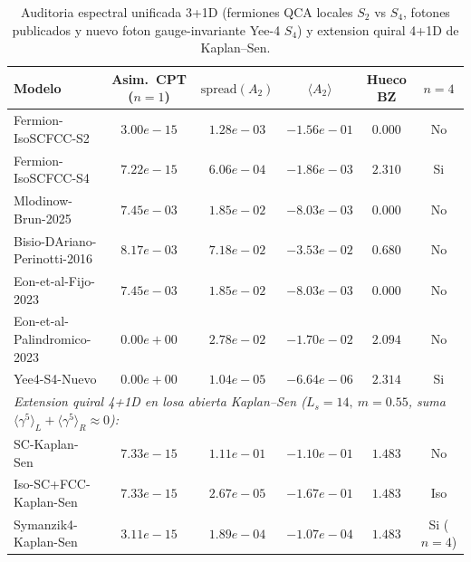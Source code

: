 
\begin{table}[t]
\centering
\caption{Auditoria espectral unificada 3+1D (fermiones QCA locales $S_2$ vs $S_4$, fotones publicados y nuevo foton gauge-invariante Yee-4 $S_4$) y extension quiral 4+1D de Kaplan--Sen.}
\label{tab:via_a_audit}
\begin{tabular}{lccccc}
\toprule
Modelo & Asim.\ CPT ($n=1$) & $\mathrm{spread}(A_2)$ & $\langle A_2\rangle$ & Hueco BZ & $n=4$ \\
\midrule
Fermion-IsoSCFCC-S2 & $3.00e-15$ & $1.28e-03$ & $-1.56e-01$ & $0.000$ & No \\
Fermion-IsoSCFCC-S4 & $7.22e-15$ & $6.06e-04$ & $-1.86e-03$ & $2.310$ & Si \\
Mlodinow-Brun-2025 & $7.45e-03$ & $1.85e-02$ & $-8.03e-03$ & $0.000$ & No \\
Bisio-DAriano-Perinotti-2016 & $8.17e-03$ & $7.18e-02$ & $-3.53e-02$ & $0.680$ & No \\
Eon-et-al-Fijo-2023 & $7.45e-03$ & $1.85e-02$ & $-8.03e-03$ & $0.000$ & No \\
Eon-et-al-Palindromico-2023 & $0.00e+00$ & $2.78e-02$ & $-1.70e-02$ & $2.094$ & No \\
Yee4-S4-Nuevo & $0.00e+00$ & $1.04e-05$ & $-6.64e-06$ & $2.314$ & Si \\
\midrule
\multicolumn{6}{l}{\textit{Extension quiral 4+1D en losa abierta Kaplan--Sen ($L_s=14,\ m=0.55$, suma $\langle\gamma^5\rangle_L+\langle\gamma^5\rangle_R \approx 0$):}} \\
SC-Kaplan-Sen & $7.33e-15$ & $1.11e-01$ & $-1.10e-01$ & $1.483$ & No \\
Iso-SC+FCC-Kaplan-Sen & $7.33e-15$ & $2.67e-05$ & $-1.67e-01$ & $1.483$ & Iso \\
Symanzik4-Kaplan-Sen & $3.11e-15$ & $1.89e-04$ & $-1.07e-04$ & $1.483$ & Si ($n=4$) \\
\bottomrule
\end{tabular}
\end{table}

